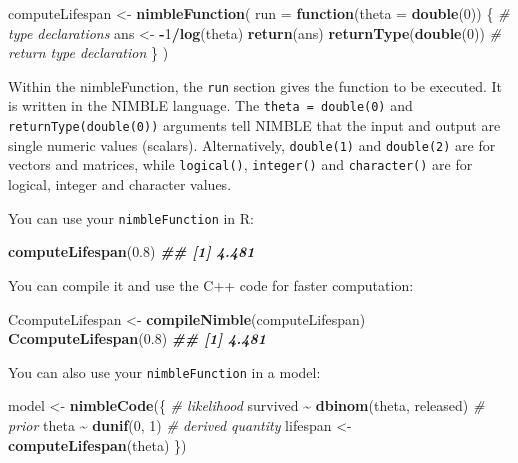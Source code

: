 \documentclass[
  12pt,
]{krantz}
\newenvironment{Shaded}{\begin{snugshade}}{\end{snugshade}}
\newcommand{\AttributeTok}[1]{\textcolor[rgb]{0.13,0.29,0.53}{#1}}
\newcommand{\CommentTok}[1]{\textcolor[rgb]{0.56,0.35,0.01}{\textit{#1}}}
\newcommand{\ControlFlowTok}[1]{\textcolor[rgb]{0.13,0.29,0.53}{\textbf{#1}}}
\newcommand{\DecValTok}[1]{\textcolor[rgb]{0.00,0.00,0.81}{#1}}
\newcommand{\DocumentationTok}[1]{\textcolor[rgb]{0.56,0.35,0.01}{\textbf{\textit{#1}}}}
\newcommand{\FloatTok}[1]{\textcolor[rgb]{0.00,0.00,0.81}{#1}}
\newcommand{\FunctionTok}[1]{\textcolor[rgb]{0.13,0.29,0.53}{\textbf{#1}}}
\newcommand{\NormalTok}[1]{#1}
\newcommand{\OtherTok}[1]{\textcolor[rgb]{0.56,0.35,0.01}{#1}}
\newcommand{\SpecialCharTok}[1]{\textcolor[rgb]{0.81,0.36,0.00}{\textbf{#1}}}
\begin{document}
\begin{Shaded}
\begin{Highlighting}[]
\NormalTok{computeLifespan }\OtherTok{\textless{}{-}} \FunctionTok{nimbleFunction}\NormalTok{(}
    \AttributeTok{run =} \ControlFlowTok{function}\NormalTok{(}\AttributeTok{theta =} \FunctionTok{double}\NormalTok{(}\DecValTok{0}\NormalTok{)) \{ }\CommentTok{\# type declarations}
\NormalTok{        ans }\OtherTok{\textless{}{-}} \SpecialCharTok{{-}}\DecValTok{1}\SpecialCharTok{/}\FunctionTok{log}\NormalTok{(theta)}
        \FunctionTok{return}\NormalTok{(ans)}
        \FunctionTok{returnType}\NormalTok{(}\FunctionTok{double}\NormalTok{(}\DecValTok{0}\NormalTok{))  }\CommentTok{\# return type declaration}
\NormalTok{    \} )}
\end{Highlighting}
\end{Shaded}

Within the nimbleFunction, the \texttt{run} section gives the function to be executed. It is written in the NIMBLE language. The \texttt{theta\ =\ double(0)} and \texttt{returnType(double(0))} arguments tell NIMBLE that the input and output are single numeric values (scalars). Alternatively, \texttt{double(1)} and \texttt{double(2)} are for vectors and matrices, while \texttt{logical()}, \texttt{integer()} and \texttt{character()} are for logical, integer and character values.

You can use your \texttt{nimbleFunction} in R:

\begin{Shaded}
\begin{Highlighting}[]
\FunctionTok{computeLifespan}\NormalTok{(}\FloatTok{0.8}\NormalTok{)}
\DocumentationTok{\#\# [1] 4.481}
\end{Highlighting}
\end{Shaded}

You can compile it and use the C++ code for faster computation:

\begin{Shaded}
\begin{Highlighting}[]
\NormalTok{CcomputeLifespan }\OtherTok{\textless{}{-}} \FunctionTok{compileNimble}\NormalTok{(computeLifespan)}
\FunctionTok{CcomputeLifespan}\NormalTok{(}\FloatTok{0.8}\NormalTok{)}
\DocumentationTok{\#\# [1] 4.481}
\end{Highlighting}
\end{Shaded}

You can also use your \texttt{nimbleFunction} in a model:

\begin{Shaded}
\begin{Highlighting}[]
\NormalTok{model }\OtherTok{\textless{}{-}} \FunctionTok{nimbleCode}\NormalTok{(\{}
  \CommentTok{\# likelihood}
\NormalTok{  survived }\SpecialCharTok{\textasciitilde{}} \FunctionTok{dbinom}\NormalTok{(theta, released)}
  \CommentTok{\# prior}
\NormalTok{  theta }\SpecialCharTok{\textasciitilde{}} \FunctionTok{dunif}\NormalTok{(}\DecValTok{0}\NormalTok{, }\DecValTok{1}\NormalTok{)}
  \CommentTok{\# derived quantity}
\NormalTok{  lifespan }\OtherTok{\textless{}{-}} \FunctionTok{computeLifespan}\NormalTok{(theta)}
\NormalTok{\})}
\end{Highlighting}
\end{Shaded}
\end{document}
